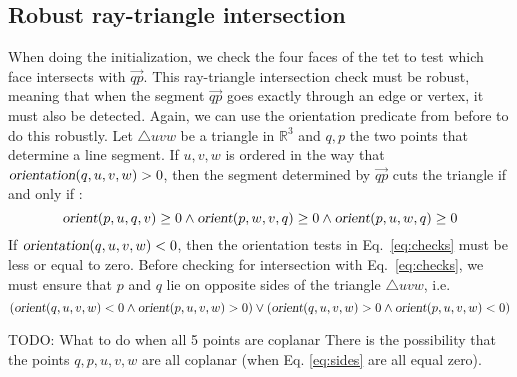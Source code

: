 \documentclass[../thesis.tex]{subfiles}
\begin{document}
\subsection{Robust ray-triangle intersection}
When doing the initialization, we check the four faces of the tet to test which face
intersects with $\Vec{qp}$. This ray-triangle intersection check must be robust, 
meaning that when the segment $\Vec{qp}$ goes exactly through an edge or vertex, it must also be detected.
Again, we can use the orientation predicate from before to do this robustly.
Let $\triangle uvw$ be a triangle in $\mathbb{R}^3$ and $q,p$ the two points
that determine a line segment. If $u,v,w$ is ordered in the way
that $\textsl{orientation}(q,u,v,w) > 0$, then the segment determined by $\Vec{qp}$
cuts the triangle if and only if \cite{segura}:
\begin{equation}\label{eq:checks}
  \op{orient}(p,u,q,v) \ge 0 \land \op{orient}(p,w,v,q) \ge 0 \land \op{orient}(p,u,w,q) \ge 0 
\end{equation}
If $\textsl{orientation}(q,u,v,w) < 0$, then the orientation tests in Eq.~\ref{eq:checks}
must be less or equal to zero.
Before checking for intersection with Eq.~\ref{eq:checks}, we must ensure that 
$p$ and $q$ lie on opposite sides of the triangle $\triangle uvw$, i.e.
\begin{equation}\label{eq:sides}
  (\op{orient}(q,u,v,w) < 0 \land \op{orient}(p,u,v,w) > 0)  \lor (\op{orient}(q,u,v,w) > 0 \land \op{orient}(p,u,v,w) < 0)  
\end{equation}

TODO: What to do when all 5 points are coplanar
There is the possibility that the points $q,p,u,v,w$ are all coplanar (when Eq. \ref{eq:sides} are all equal zero).
\end{document}

